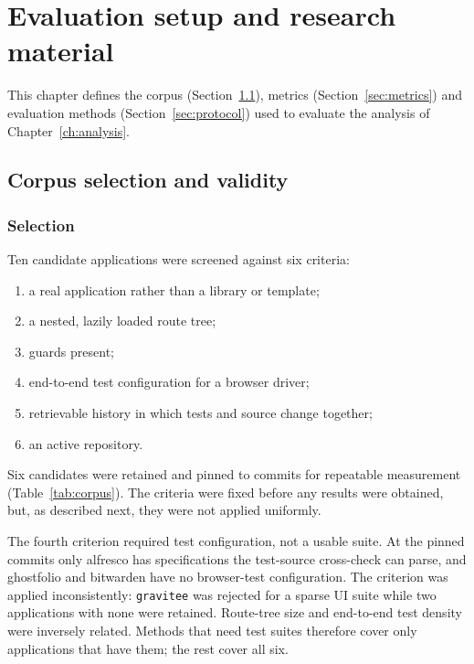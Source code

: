 \section{Evaluation setup and research material}
\label{ch:evaluation}

This chapter defines the corpus (Section~\ref{sec:corpus}), metrics (Section~\ref{sec:metrics})
and evaluation methods (Section~\ref{sec:protocol}) used to evaluate the analysis of Chapter~\ref{ch:analysis}.

\subsection{Corpus selection and validity}
\label{sec:corpus}

\subsubsection{Selection}

Ten candidate applications were screened against six criteria:
\begin{enumerate}
\item a real application rather than a library or template;
\item a nested, lazily loaded route tree;
\item guards present;
\item end-to-end test configuration for a browser driver;
\item retrievable history in which tests and source change together;
\item an active repository.
\end{enumerate}
Six candidates were retained and pinned to commits for repeatable
measurement (Table~\ref{tab:corpus}). The criteria were fixed before any results were obtained, but, as described next, they were not
applied uniformly.

The fourth criterion required test configuration, not a usable suite. At the pinned commits only
alfresco has specifications the test-source cross-check can parse, and ghostfolio and bitwarden have
no browser-test configuration. The criterion was applied inconsistently: \texttt{gravitee}
was rejected for a sparse UI suite while two applications with none were retained. Route-tree size
and end-to-end test density were inversely related. Methods that need test suites therefore cover
only applications that have them; the rest cover all six.

